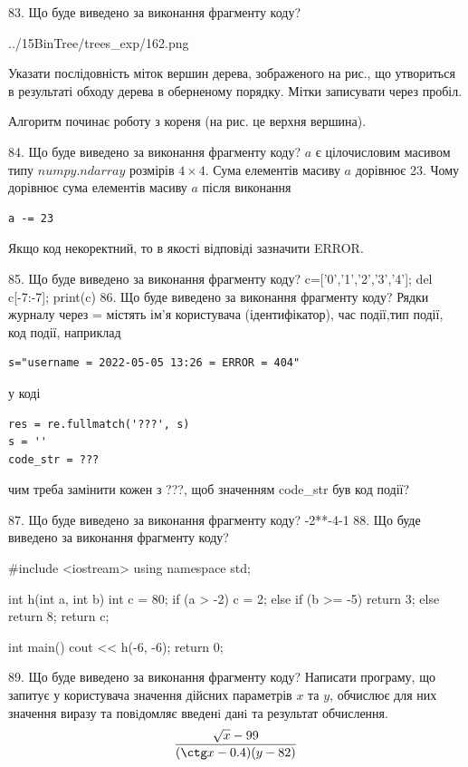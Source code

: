 \documentclass[11pt]{article}
\begin{document}
83. Що буде виведено за виконання фрагменту коду?

\begin{center}
	{../15BinTree/trees_exp/162.png}
\end{center}
Указати послідовність міток вершин дерева, зображеного на рис., що утвориться в результаті обходу дерева в оберненому порядку. Мітки записувати через пробіл.\par Алгоритм починає роботу з кореня (на рис. це верхня вершина).

84. Що буде виведено за виконання фрагменту коду?
$a$ є цілочисловим масивом типу $numpy.ndarray$ розмірів $4{\times}4$. Сума елементів масиву $a$ дорівнює 23. Чому дорівнює сума елементів масиву $a$ після виконання 
\begin{verbatim}
a -= 23
\end{verbatim}


Якщо код некоректний, то в якості відповіді зазначити ERROR.



85. Що буде виведено за виконання фрагменту коду?
c=['0','1','2','3','4']; del c[-7:-7]; print(c)
86. Що буде виведено за виконання фрагменту коду?
Рядки журналу через = містять ім'я користувача (ідентифікатор), час події,тип події, код події, наприклад
\begin{verbatim}
s="username = 2022-05-05 13:26 = ERROR = 404"
\end{verbatim}
у коді 
\begin{verbatim}
res = re.fullmatch('???', s) 
s = ''
code_str = ??? 
\end{verbatim}
чим треба замінити кожен з ???, щоб значенням code\_str був код події? 



87. Що буде виведено за виконання фрагменту коду?
-2**-4-1
88. Що буде виведено за виконання фрагменту коду?

#include <iostream>
using namespace std;

int h(int a, int b){
    int c = 80;
    if (a > -2)
        c = 2;
    else if (b >= -5)
         return 3;
    else 
        return 8;
    return c;
}

int main(){
    cout << h(-6, -6);
    return 0;
}

89. Що буде виведено за виконання фрагменту коду?
Написати програму, що запитує у користувача значення дійсних параметрів $x$ та $y$, обчислює для них значення виразу та повiдомляє введенi данi та результат обчислення.
$$\frac{\sqrt x - 99}{(\ctg x - 0.4) (y - 82)}$$ 
\end{document}
